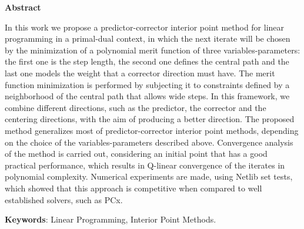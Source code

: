 \begin{center}
  \large{\textbf{Abstract}}
\end{center}




In this work we propose a predictor-corrector interior point method for linear programming in a primal-dual context, in which the next iterate will be chosen by the minimization of a polynomial merit function  of three variables-parameters: the first one is the step length, the second one defines the central path and the last one models the weight that a corrector direction must have. The merit function minimization is performed by subjecting it to constraints defined by a neighborhood of the central path that allows wide steps. In this framework, we combine  different directions, such as the predictor, the corrector and the centering directions, with the aim of producing a better direction. The proposed method generalizes most of predictor-corrector interior point methods, depending on the choice of the variables-parameters described above. Convergence analysis of the method is carried out,  considering an initial point that has a good practical performance, which results in Q-linear convergence of the iterates in polynomial complexity. Numerical experiments are made, using Netlib set tests, which  showed that this approach is competitive when compared to  well established solvers, such as PCx.





\vspace{.5cm}
\textbf{Keywords}:
Linear Programming, Interior Point Methods.
